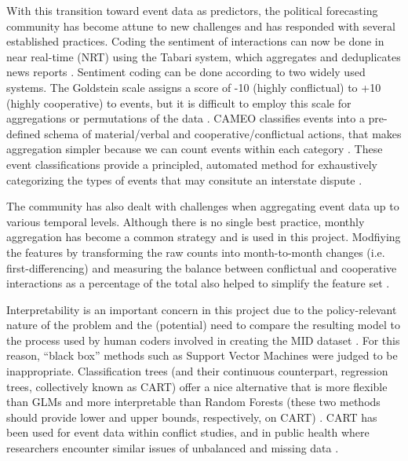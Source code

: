 \documentclass[12pt,letterpaper]{article}
\begin{document}
With this transition toward event data as predictors, the political forecasting community has become attune to new challenges and has responded with several established practices. Coding the sentiment of interactions can now be done in near real-time (NRT) using the Tabari system, which aggregates and deduplicates news reports \citep{o2010crisis,schrodt2009tabari}. Sentiment coding can be done according to two widely used systems. The Goldstein scale assigns a score of -10 (highly conflictual) to +10 (highly cooperative) to events, but it is difficult to employ this scale for aggregations or permutations of the data \citep{goldstein1992conflict}. CAMEO classifies events into a pre-defined schema of material/verbal and cooperative/conflictual actions, that makes aggregation simpler because we can count events within each category \citep{gerner:etal:2002}. These event classifications provide a principled, automated method for exhaustively categorizing  the types of events that may consitute an interstate dispute \citep{ghosn2004mid3}.

The community has also dealt with challenges when aggregating event data up to various temporal levels. Although there is no single best practice, monthly aggregation has become a common strategy \citep{arva2013improving,yonamine2013event} and is used in this project. Modfiying the features by transforming the raw counts into month-to-month changes (i.e. first-differencing) and measuring the balance between conflictual and cooperative interactions as a percentage of the total also helped to simplify the feature set \citep{Box:1976}. 

Interpretability is an important concern in this project due to the policy-relevant nature of the problem and the (potential) need to compare the resulting model to the process used by human coders involved in creating the MID dataset \citep{ghosn2004mid3}. For this reason, ``black box'' methods such as Support Vector Machines were judged to be inappropriate. Classification trees (and their continuous counterpart, regression trees, collectively known as CART) offer a nice alternative that is more flexible than GLMs and more interpretable than Random Forests (these two methods should provide lower and upper bounds, respectively, on CART) \citep{klebanov2008lexical}. CART has been used for event data within conflict studies, and in public health where researchers encounter similar issues of unbalanced and missing data \citep{schrodt1990predicting,speybroeck2012classification,trappl1996digging}.
\end{document}
